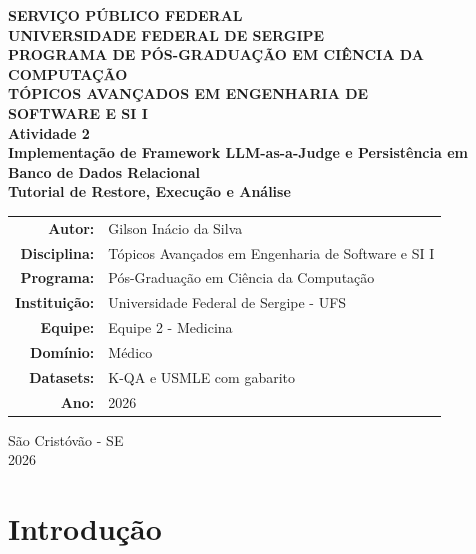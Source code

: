 \documentclass[12pt,a4paper]{article}
\begin{document}
\begin{titlepage}
    \centering
    \vspace*{1.5cm}

    {\large \textbf{SERVIÇO PÚBLICO FEDERAL}}\\[0.25cm]
    {\large \textbf{UNIVERSIDADE FEDERAL DE SERGIPE}}\\[0.25cm]
    {\large \textbf{PROGRAMA DE PÓS-GRADUAÇÃO EM CIÊNCIA DA COMPUTAÇÃO}}\\[0.7cm]

    {\Large \textbf{TÓPICOS AVANÇADOS EM ENGENHARIA DE}}\\[0.1cm]
    {\Large \textbf{SOFTWARE E SI I}}\\[1.0cm]

    {\Huge \textbf{Atividade 2}}\\[0.4cm]
    {\Large \textbf{Implementação de Framework LLM-as-a-Judge e Persistência em}}\\[0.15cm]
    {\Large \textbf{Banco de Dados Relacional}}\\[0.6cm]
    {\Large \textbf{Tutorial de Restore, Execução e Análise}}\\[1.2cm]

    \begin{tabular}{rl}
        \textbf{Autor:} & Gilson Inácio da Silva \\
        \textbf{Disciplina:} & Tópicos Avançados em Engenharia de Software e SI I \\
        \textbf{Programa:} & Pós-Graduação em Ciência da Computação \\
        \textbf{Instituição:} & Universidade Federal de Sergipe - UFS \\
        \textbf{Equipe:} & Equipe 2 - Medicina \\
        \textbf{Domínio:} & Médico \\
        \textbf{Datasets:} & K-QA e USMLE com gabarito \\
        \textbf{Ano:} & 2026 \\
    \end{tabular}

    \vfill
    {\large São Cristóvão - SE}\\[0.2cm]
    {\large 2026}
\end{titlepage}

\tableofcontents
\newpage

\section{Introdução}
\end{document}
